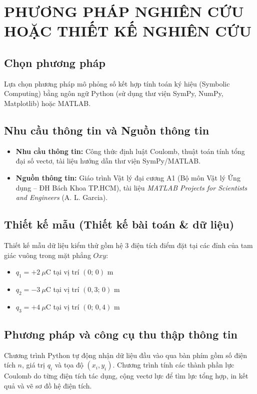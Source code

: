 \section{PHƯƠNG PHÁP NGHIÊN CỨU HOẶC THIẾT KẾ NGHIÊN CỨU}

\subsection{Chọn phương pháp}
Lựa chọn phương pháp mô phỏng số kết hợp tính toán ký hiệu (Symbolic Computing) bằng ngôn ngữ Python (sử dụng thư viện SymPy, NumPy, Matplotlib) hoặc MATLAB.

\subsection{Nhu cầu thông tin và Nguồn thông tin}
\begin{itemize}[leftmargin=1.2cm]
    \item \textbf{Nhu cầu thông tin:} Công thức định luật Coulomb, thuật toán tính tổng đại số vectơ, tài liệu hướng dẫn thư viện SymPy/MATLAB.
    \item \textbf{Nguồn thông tin:} Giáo trình Vật lý đại cương A1 (Bộ môn Vật lý Ứng dụng -- ĐH Bách Khoa TP.HCM), tài liệu \textit{MATLAB Projects for Scientists and Engineers} (A. L. Garcia).
\end{itemize}

\subsection{Thiết kế mẫu (Thiết kế bài toán \& dữ liệu)}
Thiết kế mẫu dữ liệu kiểm thử gồm hệ 3 điện tích điểm đặt tại các đỉnh của tam giác vuông trong mặt phẳng $Oxy$:
\begin{itemize}[leftmargin=1.2cm]
    \item $q_1 = +2\ \mu\text{C}$ tại vị trí $(0;\, 0)\text{ m}$
    \item $q_2 = -3\ \mu\text{C}$ tại vị trí $(0{,}3;\, 0)\text{ m}$
    \item $q_3 = +4\ \mu\text{C}$ tại vị trí $(0;\, 0{,}4)\text{ m}$
\end{itemize}

\subsection{Phương pháp và công cụ thu thập thông tin}
Chương trình Python tự động nhận dữ liệu đầu vào qua bàn phím gồm số điện tích $n$, giá trị $q_i$ và tọa độ $(x_i,y_i)$. Chương trình tính các thành phần lực Coulomb do từng điện tích tác dụng, cộng vectơ lực để tìm lực tổng hợp, in kết quả và vẽ sơ đồ hệ điện tích.

